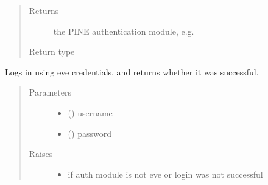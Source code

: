 \documentclass[letterpaper,10pt,english]{sphinxmanual}
\begin{document}
\begin{fulllineitems}
\begin{fulllineitems}
\begin{quote}
\begin{description}
\item[{Returns}] \leavevmode
the PINE authentication module, e.g. 

\item[{Return type}] \leavevmode
{}

\end{description}\end{quote}

\end{fulllineitems}


\begin{fulllineitems}
\label{\detokenize{autoapi/pine/client/client/index:pine.client.client.PineClient.login_eve}}
Logs in using eve credentials, and returns whether it was successful.
\begin{quote}\begin{description}
\item[{Parameters}] \leavevmode\begin{itemize}
\item {} 
 () \textendash{} username

\item {} 
 () \textendash{} password

\end{itemize}

\item[{Raises}] \leavevmode\begin{itemize}
\item {} 
{\hyperref[\detokenize{autoapi/pine/client/exceptions/index:pine.client.exceptions.PineClientAuthException}]{}} \textendash{} if auth module is not eve or login was not successful


\end{itemize}
\end{description}
\end{quote}
\end{fulllineitems}
\end{fulllineitems}
\end{document}
